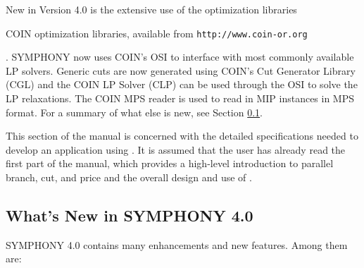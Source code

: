 New in Version 4.0 is the extensive use of the
\emph{}
optimization libraries 
\begin{latexonly} 
COIN optimization libraries,
available from \texttt{http://www.coin-or.org} 
\end{latexonly}.
SYMPHONY now uses COIN's OSI to interface with most commonly available LP
solvers. Generic cuts are now generated using COIN's Cut Generator Library
(CGL) and the COIN LP Solver (CLP) can be used through the OSI to solve the LP
relaxations. The COIN MPS reader is used to read in MIP instances in MPS
format. For a summary of what else is new, see Section \ref{whats-new}.

This section of the manual is concerned with the detailed
specifications needed to develop an application using \BB. It is
assumed that the user has already read the first part of the manual, which
provides a high-level introduction to parallel branch, cut, and price
and the overall design and use of \BB. 

\subsection{What's New in SYMPHONY 4.0}
\label{whats-new}

SYMPHONY 4.0 contains many enhancements and new features. Among them are:

